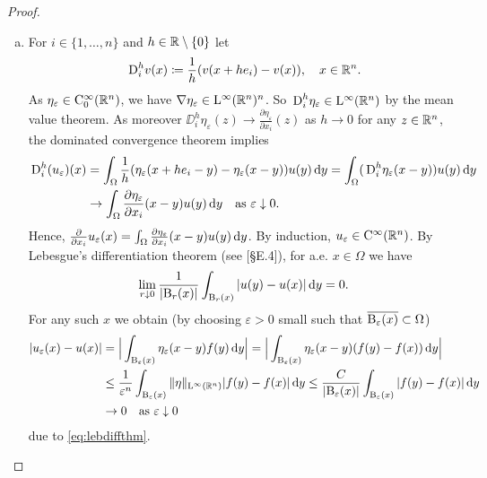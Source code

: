 \begin{proof}
  \begin{enumerate}[a)]
    \item For $i \in \{1, \dots, n\}$ and $h \in \mathbb{R} \setminus\{0\}$ let
    $$
    \,{\operatorname{D}}^h_i v(x) \coloneqq \frac{1}{h} ( v(x + h e_i) - v(x)), \quad x \in \mathbb{R}^n.
    $$
    As $\eta_\varepsilon \in \mathrm{C}_0^\infty(\mathbb{R}^n)$, we have $\nabla \eta_\varepsilon \in \mathrm{L}^\infty(\mathbb{R}^n)^n$.
    So $\,{\operatorname{D}}_i^h  \eta_\varepsilon \in \mathrm{L}^\infty(\mathbb{R}^n)$ by the mean value theorem.
    As moreover $\DD_i^h \eta_\varepsilon(z) \to \frac{\partial \eta_\varepsilon}{\partial x_i}(z)$ as $h \to 0$ for any $z \in \mathbb{R}^n$, the dominated convergence theorem implies
    \begin{align*}
      \,{\operatorname{D}}_i^h (u_\varepsilon)(x)
    &= \int_\Omega \frac{1}{h} (\eta_\varepsilon(x + h e_i - y) - \eta_\varepsilon (x - y)) u(y) \, {\operatorname{d}\!{y}} 
    = \int_\Omega (\,{\operatorname{D}}_i^h \eta_\varepsilon (x - y)) u(y) \, {\operatorname{d}\!{y}}  \\
    &\to \int_\Omega \frac{\partial \eta_\varepsilon}{\partial x_i}(x - y) u(y) \, {\operatorname{d}\!{y}} \quad\text{as } \varepsilon \downarrow 0.
    \end{align*}
    Hence, $\frac{\partial}{\partial x_i} u_\varepsilon(x) = \int_\Omega \frac{\partial \eta_\varepsilon}{\partial x_i} (x - y) u(y) \, {\operatorname{d}\!{y}}$.
    By induction, $u_\varepsilon \in \mathrm{C}^\infty(\mathbb{R}^n)$.
    By Lebesgue's differentiation theorem (see \cite{evans2010partial}[\S E.4]), for a.e. $x \in \Omega$ we have
    \begin{equation}
      \lim_{r \downarrow 0} \frac{1}{|\mathrm{B}_r(x)|} \int_{\mathrm{B}_r(x)} |u(y) - u(x)| \, {\operatorname{d}\!{y}} = 0.
      \label{eq:lebdiffthm}
    \end{equation}
    For any such $x$ we obtain (by choosing $\varepsilon > 0$ small such that $\overline{\mathrm{B}_\varepsilon(x)} \subset \Omega$)
    \begin{align}
      |u_\varepsilon(x) - u(x)|
      &= \Big| \int_{\mathrm{B}_\varepsilon(x)} \eta_\varepsilon (x - y) f(y) \, {\operatorname{d}\!{y}} \Big| 
      = \Big| \int_{\mathrm{B}_\varepsilon(x)} \eta_\varepsilon (x - y) (f(y) - f(x)) \, {\operatorname{d}\!{y}} \Big| \nonumber\\
      &\leq \frac{1}{\varepsilon^n} \int_{\mathrm{B}_\varepsilon(x)} \|\eta\|_{\mathrm{L}^\infty(\mathbb{R}^n)} |f(y) - f(x)| \, {\operatorname{d}\!{y}} \leq \frac{C}{|\mathrm{B}_\varepsilon(x)|} \int_{\mathrm{B}_\varepsilon(x)} |f(y) - f(x) | \, {\operatorname{d}\!{y}} \label{eq:pointwise}\\
      & \to 0 \quad\text{as } \varepsilon \downarrow 0 \nonumber
    \end{align}
    due to \eqref{eq:lebdiffthm}.
    

\end{enumerate}
\end{proof}
